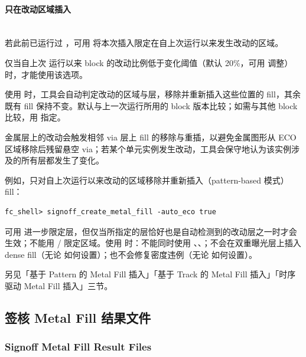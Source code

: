 \paragraph{只在改动区域插入}
\hfill\\
若此前已运行过 ，可用  将本次插入限定在自上次运行以来发生改动的区域。

\begin{noteBox}
仅当自上次  运行以来 block 的改动比例低于变化阈值（默认 20\%，可用  调整）时，才能使用该选项。
\end{noteBox}

使用  时，工具会自动判定改动的区域与层，移除并重新插入这些位置的 fill，其余既有 fill 保持不变。默认与上一次运行所用的 block 版本比较；如需与其他 block 比较，用  指定。

\begin{noteBox}
金属层上的改动会触发相邻 via 层上 fill 的移除与重插，以避免金属图形从 ECO 区域移除后残留悬空 via；若某个单元实例发生改动，工具会保守地认为该实例涉及的所有层都发生了变化。
\end{noteBox}

例如，只对自上次运行以来改动的区域移除并重新插入（pattern-based 模式）fill：

\begin{lstlisting}
fc_shell> signoff_create_metal_fill -auto_eco true
\end{lstlisting}

可用  进一步限定层，但仅当所指定的层恰好也是自动检测到的改动层之一时才会生效；不能用 / 限定区域。使用  时：不能同时使用 、、；不会在双重曝光层上插入 dense fill（无论  如何设置）；也不会修复密度违例（无论  如何设置）。

\begin{seeAlsoBox}
另见「基于 Pattern 的 Metal Fill 插入」「基于 Track 的 Metal Fill 插入」「时序驱动 Metal Fill 插入」三节。
\end{seeAlsoBox}

\subsection{签核 Metal Fill 结果文件}
\subsubsection*{Signoff Metal Fill Result Files}

